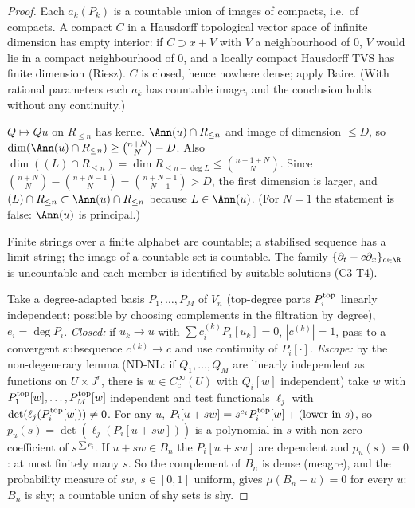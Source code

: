 \begin{proof}
Each $a_k(P_k)$ is a countable union of images of compacts, i.e.\ of compacts. A compact $C$ in a Hausdorff topological vector space of infinite dimension has empty interior: if $C\supset x+V$ with $V$ a neighbourhood of $0$, $V$ would lie in a compact neighbourhood of $0$, and a locally compact Hausdorff TVS has finite dimension (Riesz). $C$ is closed, hence nowhere dense; apply Baire. (With rational parameters each $a_k$ has countable image, and the conclusion holds without any continuity.)

$Q\mapsto Qu$ on $R_{\le n}$ has kernel $\Ann(u)\cap R_{\le n}$ and image of dimension $\le D$, so $\dim(\Ann(u)\cap R_{\le n})\ge\binom{n+N}N-D$. Also $\dim((L)\cap R_{\le n})=\dim R_{\le n-\deg L}\le\binom{n-1+N}N$. Since $\binom{n+N}N-\binom{n+N-1}N=\binom{n+N-1}{N-1}>D$, the first dimension is larger, and $(L)\cap R_{\le n}\subset\Ann(u)\cap R_{\le n}$ because $L\in\Ann(u)$. (For $N=1$ the statement is false: $\Ann(u)$ is principal.)

Finite strings over a finite alphabet are countable; a stabilised sequence has a limit string; the image of a countable set is countable. The family $\{\partial_t-c\partial_x\}_{c\in\R}$ is uncountable and each member is identified by suitable solutions (C3-T4).

Take a degree-adapted basis $P_1,\dots,P_M$ of $V_n$ (top-degree parts $P_i^{\rm top}$ linearly independent; possible by choosing complements in the filtration by degree), $e_i=\deg P_i$. \emph{Closed:} if $u_k\to u$ with $\sum c^{(k)}_iP_i[u_k]=0$, $|c^{(k)}|=1$, pass to a convergent subsequence $c^{(k)}\to c$ and use continuity of $P_i[\cdot]$. \emph{Escape:} by the non-degeneracy lemma (ND-NL: if $Q_1,\dots,Q_M$ are linearly independent as functions on $U\times J^r$, there is $w\in C_c^\infty(U)$ with $Q_i[w]$ independent) take $w$ with $P_1^{\rm top}[w],\dots,P_M^{\rm top}[w]$ independent and test functionals $\ell_j$ with $\det(\ell_j(P_i^{\rm top}[w]))\ne0$. For any $u$, $P_i[u+sw]=s^{e_i}P_i^{\rm top}[w]+(\text{lower in }s)$, so $p_u(s)=\det(\ell_j(P_i[u+sw]))$ is a polynomial in $s$ with non-zero coefficient of $s^{\sum e_i}$. If $u+sw\in B_n$ the $P_i[u+sw]$ are dependent and $p_u(s)=0$: at most finitely many $s$. So the complement of $B_n$ is dense (meagre), and the probability measure of $sw$, $s\in[0,1]$ uniform, gives $\mu(B_n-u)=0$ for every $u$: $B_n$ is shy; a countable union of shy sets is shy.

\end{proof}

